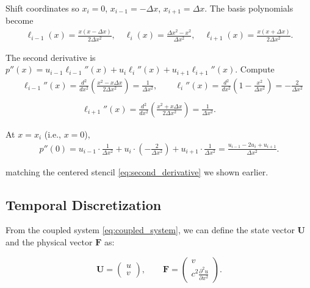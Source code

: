 Shift coordinates so $x_i = 0$, $x_{i-1} = -\Delta x$, $x_{i+1} = \Delta x$. The basis polynomials become
\begin{equation}
\begin{aligned}
\ell_{i-1}(x) = \frac{x (x - \Delta x)}{2 \Delta x^2}, \quad
\ell_i(x) = \frac{\Delta x^2 - x^2}{\Delta x^2}, \quad
\ell_{i+1}(x) = \frac{x (x + \Delta x)}{2 \Delta x^2}.
\end{aligned}
\label{eq:shifted_basis}
\end{equation}

The second derivative is $p''(x) = u_{i-1} \ell_{i-1}''(x) + u_i \ell_i''(x) + u_{i+1} \ell_{i+1}''(x)$. Compute
\begin{equation}
\begin{aligned}
&\ell_{i-1}''(x) = \frac{d^2}{dx^2} \left( \frac{x^2 - x \Delta x}{2 \Delta x^2} \right) = \frac{1}{\Delta x^2}, \qquad
\ell_i''(x) = \frac{d^2}{dx^2} \left( 1 - \frac{x^2}{\Delta x^2} \right) = -\frac{2}{\Delta x^2} \\ \\
&\hspace{7em} \ell_{i+1}''(x) = \frac{d^2}{dx^2} \left( \frac{x^2 + x \Delta x}{2 \Delta x^2} \right) = \frac{1}{\Delta x^2}.
\end{aligned}
\label{eq:second_derivatives}
\end{equation}

At $x = x_i$ (i.e., $x = 0$), 
\begin{equation}
\begin{aligned}
p''(0) = u_{i-1} \cdot \frac{1}{\Delta x^2} + u_i \cdot \left( -\frac{2}{\Delta x^2} \right) + u_{i+1} \cdot \frac{1}{\Delta x^2} = \frac{u_{i-1} - 2u_i + u_{i+1}}{\Delta x^2}.
\end{aligned}
\end{equation}

matching the centered stencil \eqref{eq:second_derivative} we shown earlier.

\clearpage

\subsection{Temporal Discretization}

From the coupled system \eqref{eq:coupled_system}, we can define the state vector $\mathbf{U}$  and the physical vector $\mathbf{F}$ as:

\begin{equation}
\mathbf{U} = \begin{pmatrix} u \\ v \end{pmatrix}, \qquad \mathbf{F} = \begin{pmatrix} v \\ c^2 \frac{\partial^2 u}{\partial x^2} \end{pmatrix}.
\end{equation}

